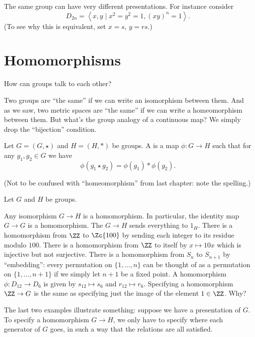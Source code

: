 \begin{example}
	The same group can have very different presentations.
	For instance consider
	\[ D_{2n} = \left< x,y \mid x^2=y^2=1, (xy)^n=1 \right>. \]
	(To see why this is equivalent, set $x=s$, $y=rs$.)
\end{example}

\section{Homomorphisms}

How can groups talk to each other?

Two groups are ``the same'' if we can write an isomorphism between them.
And as we saw, two metric spaces are ``the same''
if we can write a homeomorphism between them.
But what's the group analogy of a continuous map?
We simply drop the ``bijection'' condition.

\begin{definition}
	Let $G = (G, \star)$ and $H = (H, \ast)$ be groups.
	A  is a map $\phi \colon G \to H$
	such that for any $g_1, g_2 \in G$ we have
	\[ \phi(g_1 \star g_2) = \phi(g_1) \ast \phi(g_2). \]
\end{definition}
(Not to be confused with ``homeomorphism'' from
last chapter: note the spelling.)

\begin{example}
	Let $G$ and $H$ be groups.
	\begin{enumerate}[(a)]
		\ii Any isomorphism $G \to H$ is a homomorphism.
		In particular, the identity map $G \to G$ is a homomorphism.
		\ii The  $G \to H$ sends
		everything to $1_H$.
		\ii There is a homomorphism from $\ZZ$ to $\Zc{100}$ by
		sending each integer to its residue modulo $100$.
		\ii There is a homomorphism from $\ZZ$ to itself by $x \mapsto 10x$
		which is injective but not surjective.
		\ii There is a homomorphism from $S_n$ to $S_{n+1}$ by ``embedding'':
		every permutation on $\{1,\dots,n\}$ can be thought of as a permutation
		on $\{1,\dots,n+1\}$ if we simply let $n+1$ be a fixed point.
		\ii A homomorphism $\phi: D_{12} \to D_6$
		is given by $s_{12} \mapsto s_6$
		and $r_{12} \mapsto r_6$.
		\ii Specifying a homomorphism $\ZZ \to G$ is the same as
		specifying just the image of the element $1 \in \ZZ$. Why?
	\end{enumerate}
\end{example}
The last two examples illustrate something: suppose we have a presentation of $G$.
To specify a homomorphism $G \to H$, we only have to specify where each generator of $G$ goes, in such a way that the relations are all satisfied.

